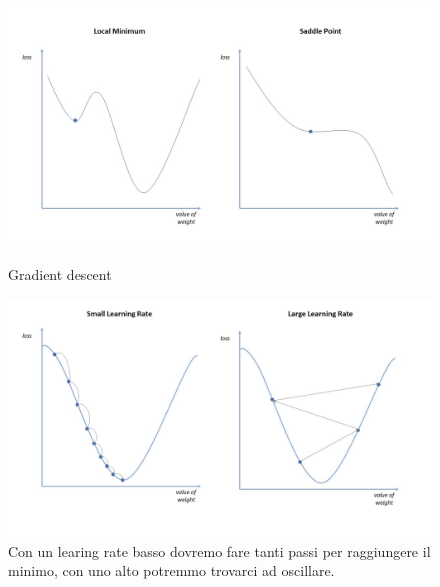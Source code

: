 	\begin{figure}
		\centering
		\begin{minipage}{.5\textwidth}
			\centering
			\includegraphics[width=1\linewidth]{imgs/chapter8/img1}
			\caption{Gradient descent}
			\label{fig:chapter08-01}
		\end{minipage}%
		\begin{minipage}{.5\textwidth}
			\centering
			\includegraphics[width=1\linewidth]{imgs/chapter8/img2}
			\caption{Con un learing rate basso dovremo fare tanti passi per raggiungere il minimo, con uno alto potremmo trovarci ad oscillare.}
			\label{fig:chapter08-02}
		\end{minipage}
	\end{figure}

